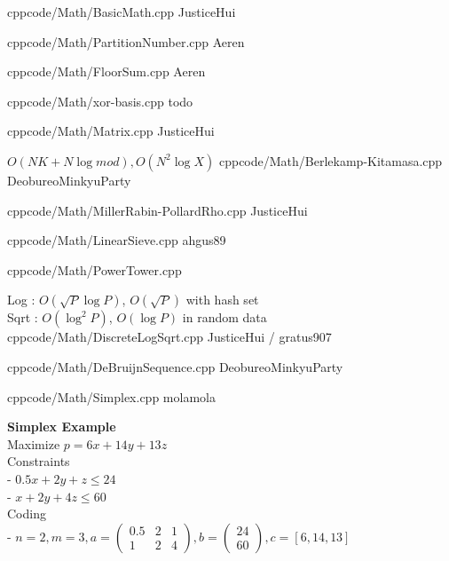 \documentclass[landscape, 8pt, a4paper, oneside, twocolumn]{extarticle}
\begin{document}
{}{}
{cpp}{code/Math/BasicMath.cpp}
{JusticeHui}

{}{}
{cpp}{code/Math/PartitionNumber.cpp}
{Aeren}

{}{}
{cpp}{code/Math/FloorSum.cpp}
{Aeren}

{}{}
{cpp}{code/Math/xor-basis.cpp}
{todo}

{}{}
{cpp}{code/Math/Matrix.cpp}
{JusticeHui}


{}{$O(NK + N \log mod), O(N^2 \log X)$}
{cpp}{code/Math/Berlekamp-Kitamasa.cpp}
{DeobureoMinkyuParty}

{}{}
{cpp}{code/Math/MillerRabin-PollardRho.cpp}
{JusticeHui}

{}{}
{cpp}{code/Math/LinearSieve.cpp}
{ahgus89}

{}{}
{cpp}{code/Math/PowerTower.cpp}
{}

{}{Log : $O(\sqrt P \log P)$, $O(\sqrt P)$ with hash set\\Sqrt : $O(\log^2 P)$, $O(\log P)$ in random data}
{cpp}{code/Math/DiscreteLogSqrt.cpp}
{JusticeHui / gratus907}

{}{}
{cpp}{code/Math/DeBruijnSequence.cpp}
{DeobureoMinkyuParty}

{}{}
{cpp}{code/Math/Simplex.cpp}
{molamola}

\noindent
\textbf{Simplex Example}\\
Maximize $p = 6x + 14y + 13z$\\
Constraints \\
- $0.5x + 2y + z \leq 24$\\
- $x + 2y + 4z \leq 60$\\
Coding\\
- $n = 2, m = 3, a = \begin{pmatrix} 0.5 & 2 & 1 \\ 1 & 2 & 4 \end{pmatrix}, b = \begin{pmatrix} 24 \\ 60 \end{pmatrix}, c = [6, 14, 13]$
\end{document}
